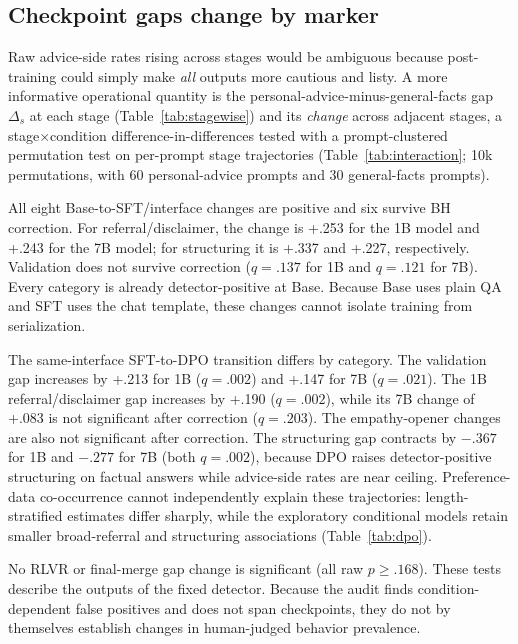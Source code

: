 \documentclass[11pt]{article}
\begin{document}
\subsection{Checkpoint gaps change by marker}
\label{sec:stagewise}

Raw advice-side rates rising across stages would be ambiguous because post-training
could simply make \emph{all} outputs more cautious and listy. A more informative
operational quantity is the personal-advice-minus-general-facts gap $\Delta_s$ at each stage
(Table~\ref{tab:stagewise}) and its \emph{change} across adjacent stages, a
stage$\times$condition difference-in-differences tested with a prompt-clustered
permutation test on per-prompt stage trajectories (Table~\ref{tab:interaction};
10k permutations, with 60 personal-advice prompts and 30 general-facts prompts).

All eight Base-to-SFT/interface changes are positive and six survive BH
correction. For referral/disclaimer, the change is +.253 for the 1B model and
+.243 for the 7B model; for structuring it is +.337 and +.227, respectively.
Validation does not survive correction ($q=.137$ for 1B and $q=.121$ for 7B).
Every category is already detector-positive at Base. Because Base uses plain QA
and SFT uses the chat template, these changes cannot isolate training from
serialization.

The same-interface SFT-to-DPO transition differs by category. The validation
gap increases by +.213 for 1B ($q=.002$) and +.147 for 7B ($q=.021$). The 1B
referral/disclaimer gap increases by +.190 ($q=.002$), while its 7B change of
+.083 is not significant after correction ($q=.203$). The empathy-opener
changes are also not significant after correction. The structuring gap
contracts by $-.367$ for 1B and $-.277$ for 7B (both $q=.002$), because DPO
raises detector-positive structuring on factual answers while advice-side rates
are near ceiling. Preference-data co-occurrence cannot independently explain
these trajectories: length-stratified estimates differ sharply, while the
exploratory conditional models retain smaller broad-referral and structuring
associations (Table~\ref{tab:dpo}).

No RLVR or final-merge gap change is significant (all raw $p\geq.168$). These
tests describe the outputs of the fixed detector. Because the audit finds
condition-dependent false positives and does not span checkpoints, they do not
by themselves establish changes in human-judged behavior prevalence.
\end{document}
